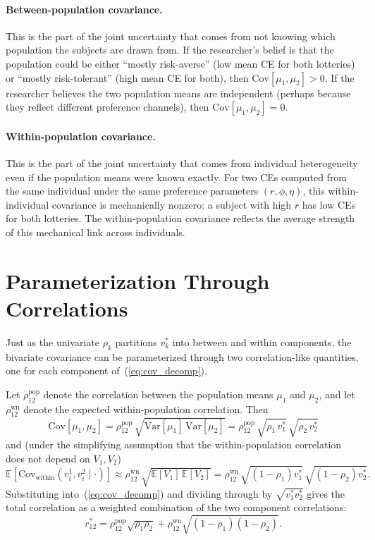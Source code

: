 \documentclass[11pt,a4paper]{article}
\theoremstyle{definition}
\newcommand{\E}{\mathbb{E}}
\newcommand{\Var}{\mathrm{Var}}
\newcommand{\Cov}{\mathrm{Cov}}
\newcommand{\dpv}{v^*}
\newcommand{\dpr}{r^*}
\begin{document}
\paragraph{Between-population covariance.}
This is the part of the joint uncertainty that comes from not knowing
which population the subjects are drawn from. If the researcher's belief
is that the population could be either ``mostly risk-averse'' (low mean
CE for both lotteries) or ``mostly risk-tolerant'' (high mean CE for
both), then $\Cov[\mu_1, \mu_2] > 0$. If the researcher believes the two
population means are independent (perhaps because they reflect different
preference channels), then $\Cov[\mu_1, \mu_2] = 0$.

\paragraph{Within-population covariance.}
This is the part of the joint uncertainty that comes from individual
heterogeneity even if the population means were known exactly. For two
CEs computed from the same individual under the same preference
parameters $(r, \phi, \eta)$, this within-individual covariance is
mechanically nonzero: a subject with high $r$ has low CEs for both
lotteries. The within-population covariance reflects the average
strength of this mechanical link across individuals.

\section{Parameterization Through Correlations}

Just as the univariate $\rho_k$ partitions $\dpv_k$ into between and
within components, the bivariate covariance can be parameterized through
two correlation-like quantities, one for each component
of~(\ref{eq:cov_decomp}).

Let $\rho^{\text{pop}}_{12}$ denote the correlation between the
population means $\mu_1$ and $\mu_2$, and let
$\rho^{\text{wn}}_{12}$ denote the expected within-population
correlation. Then
\begin{equation}
  \Cov[\mu_1, \mu_2]
  = \rho^{\text{pop}}_{12}\,\sqrt{\Var[\mu_1]\,\Var[\mu_2]}
  = \rho^{\text{pop}}_{12}\,\sqrt{\rho_1\,\dpv_1}\,\sqrt{\rho_2\,\dpv_2}
\end{equation}
and (under the simplifying assumption that the within-population
correlation does not depend on $V_1, V_2$)
\begin{equation}
  \E[\Cov_{\text{within}}(v_i^1, v_i^2 \mid \cdot)]
  \approx \rho^{\text{wn}}_{12}\,\sqrt{\E[V_1]\,\E[V_2]}
  = \rho^{\text{wn}}_{12}\,\sqrt{(1-\rho_1)\dpv_1}\,\sqrt{(1-\rho_2)\dpv_2}.
\end{equation}
Substituting into~(\ref{eq:cov_decomp}) and dividing through by
$\sqrt{\dpv_1 \dpv_2}$ gives the total correlation as a weighted
combination of the two component correlations:
\begin{equation}
  \label{eq:total_corr}
  \dpr_{12}
  = \rho^{\text{pop}}_{12}\sqrt{\rho_1 \rho_2}
  + \rho^{\text{wn}}_{12}\sqrt{(1-\rho_1)(1-\rho_2)}.
\end{equation}
\end{document}
